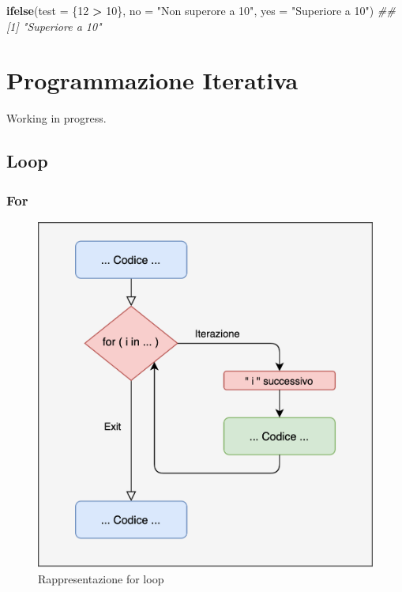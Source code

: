 \documentclass[
]{book}
\newenvironment{Shaded}{\begin{snugshade}}{\end{snugshade}}
\newcommand{\CommentTok}[1]{\textcolor[rgb]{0.56,0.35,0.01}{\textit{#1}}}
\newcommand{\DataTypeTok}[1]{\textcolor[rgb]{0.13,0.29,0.53}{#1}}
\newcommand{\DecValTok}[1]{\textcolor[rgb]{0.00,0.00,0.81}{#1}}
\newcommand{\KeywordTok}[1]{\textcolor[rgb]{0.13,0.29,0.53}{\textbf{#1}}}
\newcommand{\NormalTok}[1]{#1}
\newcommand{\OperatorTok}[1]{\textcolor[rgb]{0.81,0.36,0.00}{\textbf{#1}}}
\newcommand{\StringTok}[1]{\textcolor[rgb]{0.31,0.60,0.02}{#1}}
\begin{document}
\begin{Shaded}
\begin{Highlighting}[]
\KeywordTok{ifelse}\NormalTok{(}\DataTypeTok{test =}\NormalTok{ \{}\DecValTok{12} \OperatorTok{>}\StringTok{ }\DecValTok{10}\NormalTok{\}, }\DataTypeTok{no =} \StringTok{"Non superore a 10"}\NormalTok{, }\DataTypeTok{yes =} \StringTok{"Superiore a 10"}\NormalTok{)}
\CommentTok{## [1] "Superiore a 10"}
\end{Highlighting}
\end{Shaded}

\hypertarget{loop}{%
\chapter{Programmazione Iterativa}\label{loop}}

Working in progress.

\hypertarget{loop-1}{%
\section{Loop}\label{loop-1}}

\hypertarget{for}{%
\subsection{For}\label{for}}

\begin{figure}

{\centering \includegraphics[width=0.65\linewidth]{images/for_loop} 

}

\caption{Rappresentazione for loop}\label{fig:plot-for-loop}
\end{figure}
\end{document}

